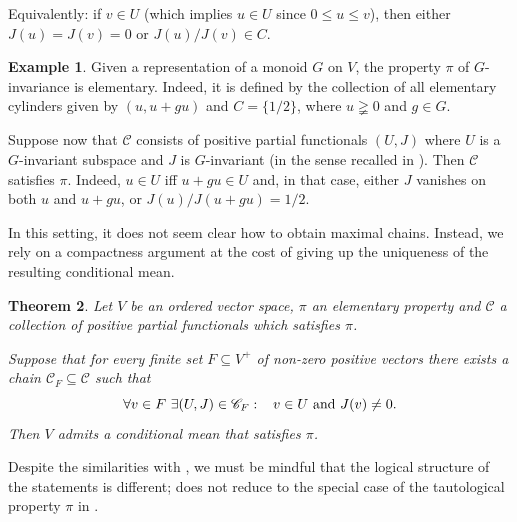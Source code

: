 \documentclass[11pt]{amsart}
\numberwithin{equation}{section}
\newtheorem{thm}{Theorem}[section]
\theoremstyle{definition}
\newtheorem{exam}[thm]{Example}
\theoremstyle{definition}
\newcommand*{\sC}{\mathscr{C}}
\newcommand*{\se}{\subseteq}
\begin{document}
\smallskip
\noindent
Equivalently: if $v\in U$ (which implies $u\in U$ since $0\leq u \leq v$), then  either $J(u) = J(v)=0$ or $J(u) / J(v)\in C$.


\begin{exam}\label{exam:inv}
Given a representation of a monoid $G$ on $V$, the property $\pi$ of $G$-invariance is elementary. Indeed, it is defined by the collection of all elementary cylinders given by $(u, u+ g u)$ and $C=\{1/2\}$, where $u\gneqq 0$ and $g\in G$.

Suppose now that $\sC$ consists of positive partial functionals $(U, J)$ where $U$ is a $G$-invariant subspace and $J$ is $G$-invariant (in the sense recalled in ). Then $\sC$ satisfies $\pi$. Indeed, $u\in U$ iff $u+g u\in U$ and, in that case, either $J$ vanishes on both $u$ and $u+ g u$, or $J(u)/J(u +g u)=1/2$.
\end{exam}

In this setting, it does not seem clear how to obtain maximal chains. Instead, we rely on a compactness argument at the cost of giving up the uniqueness of the resulting conditional mean.

\begin{thm}\label{thm:PPF-VP}
Let $V$ be an ordered vector space, $\pi$ an elementary property and $\sC$ a collection of positive partial functionals which satisfies $\pi$.

Suppose that for every finite set $F\se V^+$ of non-zero positive vectors there exists a chain $\sC_F \se \sC$ such that
\begin{equation*}
\forall v\in F \ \exists (U, J)\in \sC_F : \kern3mm v\in U \text{ and } J(v) \neq 0.
\end{equation*}
Then $V$ admits a conditional mean that satisfies $\pi$.
\end{thm}

Despite the similarities with , we must be mindful that the logical structure of the statements is different;  does not reduce to the special case of the tautological property $\pi$ in .
\end{document}
